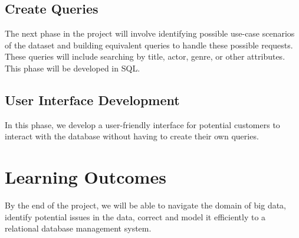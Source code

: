 \documentclass{sig-alternate}
\begin{document}
\subsection{Create Queries}
The next phase in the project will involve identifying possible use-case scenarios of the dataset and building equivalent queries to handle these possible requests. These queries will include searching by title, actor, genre, or other attributes. This phase will be developed in SQL. 
\subsection{User Interface Development}
In this phase, we develop a user-friendly interface for potential customers to interact with the database without having to create their own queries. 
\section{Learning Outcomes}
By the end of the project, we will be able to navigate the domain of big data, identify potential issues in the data, correct and model it efficiently to a relational database management system. 
\end{document}
